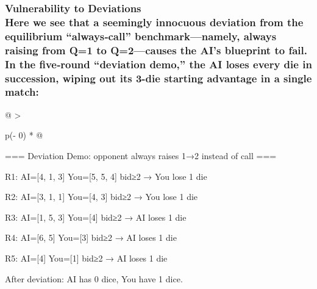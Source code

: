 \documentclass[
]{article}
\begin{document}
\subsubsection*{\texorpdfstring{\textbf{Vulnerability to Deviations\\
}Here we see that a seemingly innocuous deviation from the equilibrium
``always‐call'' benchmark---namely, always raising from Q=1 to
Q=2---causes the AI's blueprint to fail. In the five‐round ``deviation
demo,'' the AI loses every die in succession, wiping out its 3-die
starting advantage in a single
match:}{Vulnerability to Deviations Here we see that a seemingly innocuous deviation from the equilibrium ``always‐call'' benchmark---namely, always raising from Q=1 to Q=2---causes the AI's blueprint to fail. In the five‐round ``deviation demo,'' the AI loses every die in succession, wiping out its 3-die starting advantage in a single match:}}\label{vulnerability-to-deviations-here-we-see-that-a-seemingly-innocuous-deviation-from-the-equilibrium-alwayscall-benchmarknamely-always-raising-from-q1-to-q2causes-the-ais-blueprint-to-fail.-in-the-fiveround-deviation-demo-the-ai-loses-every-die-in-succession-wiping-out-its-3-die-starting-advantage-in-a-single-match}

\begin{longtable}[]{@{}
  >{\raggedright\arraybackslash}p{(\columnwidth - 0\tabcolsep) * }@{}}
\toprule\noalign{}
\begin{minipage}[b]{\linewidth}\raggedright
=== Deviation Demo: opponent always raises 1→2 instead of call ===

R1: AI={[}4, 1, 3{]} You={[}5, 5, 4{]} bid≥2 → You lose 1 die

R2: AI={[}3, 1, 1{]} You={[}4, 3{]} bid≥2 → You lose 1 die

R3: AI={[}1, 5, 3{]} You={[}4{]} bid≥2 → AI loses 1 die

R4: AI={[}6, 5{]} You={[}3{]} bid≥2 → AI loses 1 die

R5: AI={[}4{]} You={[}1{]} bid≥2 → AI loses 1 die

After deviation: AI has 0 dice, You have 1 dice.
\end{minipage} \\
\midrule\noalign{}
\endhead
\bottomrule\noalign{}
\endlastfoot
\end{longtable}
\end{document}
